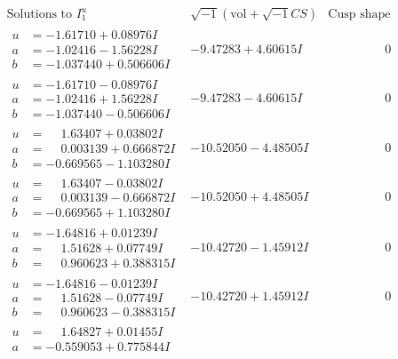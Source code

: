 \documentclass[1p]{elsarticle_modified}
\theoremstyle{definition}
\newcommand{\I}{\sqrt{-1}}
\begin{document}
$$\begin{array}{c|c|c}
\text{Solutions to }I^u_{1}& \I (\text{vol} + \sqrt{-1}CS) & \text{Cusp shape}\\
 \hline 
\begin{aligned}
u &= -1.61710 + 0.08976 I \\
a &= -1.02416 - 1.56228 I \\
b &= -1.037440 + 0.506606 I\end{aligned}
 & -9.47283 + 4.60615 I & \phantom{-0.000000 } 0 \\ \hline\begin{aligned}
u &= -1.61710 - 0.08976 I \\
a &= -1.02416 + 1.56228 I \\
b &= -1.037440 - 0.506606 I\end{aligned}
 & -9.47283 - 4.60615 I & \phantom{-0.000000 } 0 \\ \hline\begin{aligned}
u &= \phantom{-}1.63407 + 0.03802 I \\
a &= \phantom{-}0.003139 + 0.666872 I \\
b &= -0.669565 - 1.103280 I\end{aligned}
 & -10.52050 - 4.48505 I & \phantom{-0.000000 } 0 \\ \hline\begin{aligned}
u &= \phantom{-}1.63407 - 0.03802 I \\
a &= \phantom{-}0.003139 - 0.666872 I \\
b &= -0.669565 + 1.103280 I\end{aligned}
 & -10.52050 + 4.48505 I & \phantom{-0.000000 } 0 \\ \hline\begin{aligned}
u &= -1.64816 + 0.01239 I \\
a &= \phantom{-}1.51628 + 0.07749 I \\
b &= \phantom{-}0.960623 + 0.388315 I\end{aligned}
 & -10.42720 - 1.45912 I & \phantom{-0.000000 } 0 \\ \hline\begin{aligned}
u &= -1.64816 - 0.01239 I \\
a &= \phantom{-}1.51628 - 0.07749 I \\
b &= \phantom{-}0.960623 - 0.388315 I\end{aligned}
 & -10.42720 + 1.45912 I & \phantom{-0.000000 } 0 \\ \hline\begin{aligned}
u &= \phantom{-}1.64827 + 0.01455 I \\
a &= -0.559053 + 0.775844 I \\

\end{aligned}
\end{array}$$
\end{document}
